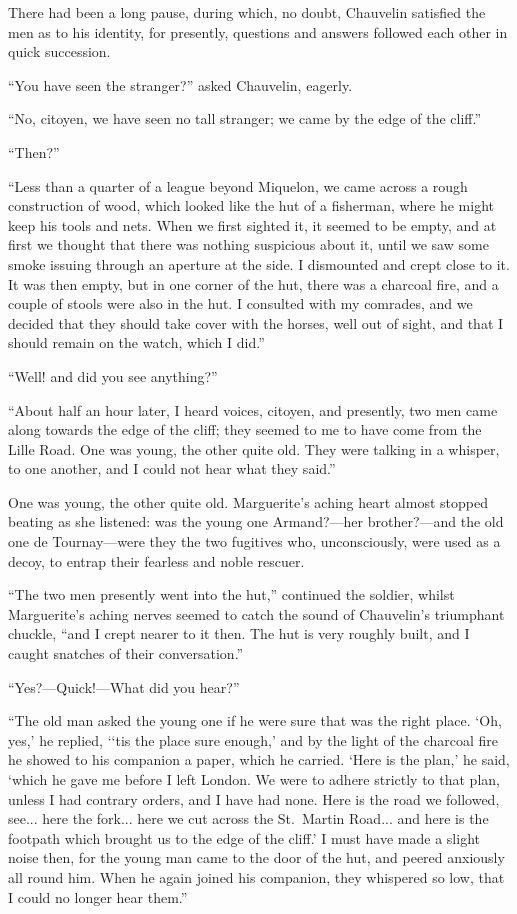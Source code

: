 \documentclass[paper=a5,BCOR=7mm,twoside,DIV=calc,12pt,usegeometry,chapterprefix,endperiod,headings=big]{scrbook}
\begin{document}
There had been a long pause, during which, no doubt, Chauvelin satisfied the men as to his identity, for presently, questions and answers followed each other in quick succession.

\enquote{You have seen the stranger?} asked Chauvelin, eagerly.

\enquote{No, citoyen, we have seen no tall stranger; we came by the edge of the cliff.}

\enquote{Then?}

\enquote{Less than a quarter of a league beyond Miquelon, we came across a rough construction of wood, which looked like the hut of a fisherman, where he might keep his tools and nets. When we first sighted it, it seemed to be empty, and at first we thought that there was nothing suspicious about it, until we saw some smoke issuing through an aperture at the side. I dismounted and crept close to it. It was then empty, but in one corner of the hut, there was a charcoal fire, and a couple of stools were also in the hut. I consulted with my comrades, and we decided that they should take cover with the horses, well out of sight, and that I should remain on the watch, which I did.}

\enquote{Well! and did you see anything?}

\enquote{About half an hour later, I heard voices, citoyen, and presently, two men came along towards the edge of the cliff; they seemed to me to have come from the Lille Road. One was young, the other quite old. They were talking in a whisper, to one another, and I could not hear what they said.}

One was young, the other quite old. Marguerite's aching heart almost stopped beating as she listened: was the young one Armand?---her brother?---and the old one de Tournay---were they the two fugitives who, unconsciously, were used as a decoy, to entrap their fearless and noble rescuer.

\enquote{The two men presently went into the hut,} continued the soldier, whilst Marguerite's aching nerves seemed to catch the sound of Chauvelin's triumphant chuckle, \enquote{and I crept nearer to it then. The hut is very roughly built, and I caught snatches of their conversation.}

\enquote{Yes?---Quick!---What did you hear?}

\enquote{The old man asked the young one if he were sure that was the right place. \enquote{Oh, yes,} he replied, \enquote{`tis the place sure enough,} and by the light of the charcoal fire he showed to his companion a paper, which he carried. \enquote{Here is the plan,} he said, \enquote{which he gave me before I left London. We were to adhere strictly to that plan, unless I had contrary orders, and I have had none. Here is the road we followed, see... here the fork... here we cut across the St.~Martin Road... and here is the footpath which brought us to the edge of the cliff.} I must have made a slight noise then, for the young man came to the door of the hut, and peered anxiously all round him. When he again joined his companion, they whispered so low, that I could no longer hear them.}
\end{document}
